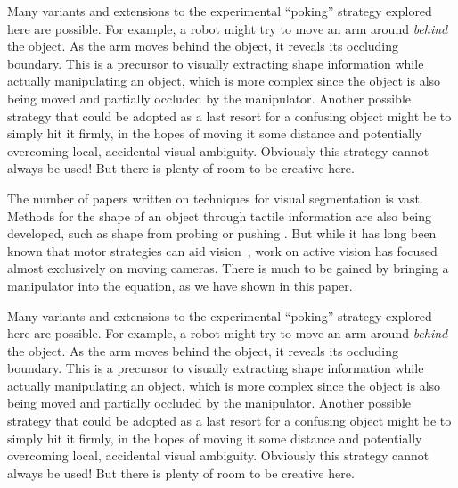 
\ifverbose
Many variants and extensions to the
experimental ``poking'' strategy explored here are possible.  For
example, a robot might try to move an arm around {\em behind} the
object.  As the arm moves behind the object, it reveals its occluding
boundary.  This is a precursor to visually extracting shape
information while actually manipulating an object, which is more
complex since the object is also being moved and partially occluded by
the manipulator.  Another possible strategy that could be adopted as a
last resort for a confusing object might be to simply hit it firmly,
in the hopes of moving it some distance and potentially overcoming
local, accidental visual ambiguity.  Obviously this strategy cannot
always be used!  But there is plenty of room to be creative here.
\fi



\ifverbose
The number of papers written on techniques for visual segmentation is
vast.  Methods for \ahhcharacterizing{} the shape of an object through
tactile information are also being developed, such as shape from
probing 
\cite{paulos99fast} 
or pushing
\cite{moll01reconstructing}.
But while it has long
been known that motor strategies can aid
vision~\cite{ballard91animate}, work on active vision has focused
almost exclusively on moving cameras.  There is much to be gained by
bringing a manipulator into the equation, as we have shown in this
paper.  

Many variants and extensions to the experimental ``poking''
strategy explored here are possible.  For example, a robot might try
to move an arm around {\em behind} the object.  As the arm moves
behind the object, it reveals its occluding boundary.  This is a
precursor to visually extracting shape information while actually
manipulating an object, which is more complex since the object is also
being moved and partially occluded by the manipulator.  Another
possible strategy that could be adopted as a last resort for a
confusing object might be to simply hit it firmly, in the hopes of
moving it some distance and potentially overcoming local, accidental
visual ambiguity.  Obviously this strategy cannot always be used!  But
there is plenty of room to be creative here.
\fi


